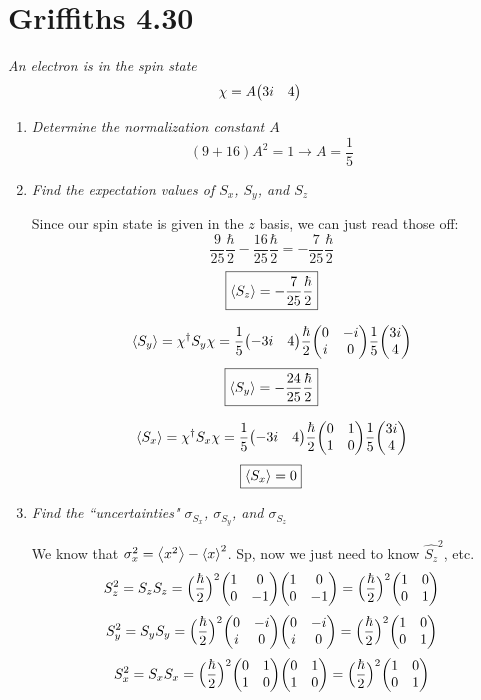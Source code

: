 \documentclass[12pt]{article}
\begin{document}
\section*{Griffiths 4.30}
{\sl An electron is in the spin state}
\[\chi = A \mqty(3i & 4)\]
\begin{enumerate}[label=\alph*)]
\item {\sl Determine the normalization constant $A$}
\[(9+16)A^2 = 1 \rightarrow \boxed{A = \frac{1}{5}}\]

\item {\sl Find the expectation values of $S_x$, $S_y$, and $S_z$}

Since our spin state is given in the $z$ basis, we can just read those off: 
\[\frac{9}{25}\frac{\hbar}{2} - \frac{16}{25}\frac{\hbar}{2} = -\frac{7}{25}\frac{\hbar}{2}\]
\[\boxed{\ev{S_z} = -\frac{7}{25}\frac{\hbar}{2}}\]

\[\ev{S_y} = \chi^\dagger S_y \chi = \frac{1}{5}\mqty(-3i & 4)\frac{\hbar}{2}\mqty(0 & -i \\ i & 0)\frac{1}{5}\mqty(3i \\ 4)\]
\[\boxed{\ev{S_y} = -\frac{24}{25}\frac{\hbar}{2}}\]

\[\ev{S_x} = \chi^\dagger S_x \chi = \frac{1}{5}\mqty(-3i & 4)\frac{\hbar}{2}\mqty(0 & 1 \\ 1 & 0)\frac{1}{5}\mqty(3i \\ 4)\]
\[\boxed{\ev{S_x} = 0}\]

\item {\sl Find the ``uncertainties" $\sigma_{S_x}$, $\sigma_{S_y}$, and $\sigma_{S_z}$}

We know that $\sigma_x^2 = \ev{x^2} - \ev{x}^2$. Sp, now we just need to know $\hat{S_z}^2$, etc. 
\[S_z^2 = S_z S_z = \Big(\frac{\hbar}{2}\Big)^2\mqty(1 & 0 \\ 0 & -1) \mqty(1 & 0 \\ 0 & -1) = \Big(\frac{\hbar}{2}\Big)^2\mqty(1 & 0 \\ 0 & 1)\]
\[S_y^2 = S_y S_y = \Big(\frac{\hbar}{2}\Big)^2\mqty(0 & -i \\ i & 0) \mqty(0 & -i \\ i & 0) = \Big(\frac{\hbar}{2}\Big)^2\mqty(1 & 0 \\ 0 & 1)\]
\[S_x^2 = S_x S_x = \Big(\frac{\hbar}{2}\Big)^2\mqty(0 & 1 \\ 1 & 0) \mqty(0 & 1 \\ 1 & 0) = \Big(\frac{\hbar}{2}\Big)^2\mqty(1 & 0 \\ 0 & 1)\]


\end{enumerate}
\end{document}
